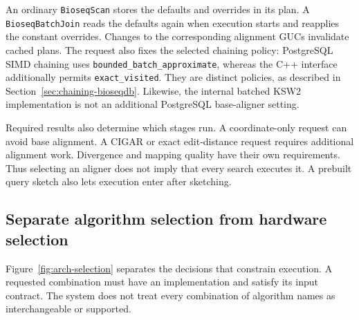 An ordinary \texttt{BioseqScan} stores the defaults and overrides in its
plan. A \texttt{BioseqBatchJoin} reads the defaults again when execution
starts and reapplies the constant overrides. Changes to the corresponding
alignment GUCs invalidate cached plans.
The request also fixes the selected chaining policy:
PostgreSQL SIMD chaining uses \texttt{bounded\_\allowbreak batch\_\allowbreak approximate}, whereas
the C++ interface additionally permits \texttt{exact\_visited}. They are
distinct policies, as described in Section~\ref{sec:chaining-bioseqdb}.
Likewise, the internal batched KSW2 implementation is not an additional
PostgreSQL base-aligner setting.

Required results also determine which stages run. A coordinate-only request
can avoid base alignment. A CIGAR or exact edit-distance request requires
additional alignment work. Divergence and mapping quality have their own
requirements. Thus selecting an aligner does not imply that every search
executes it. A prebuilt query sketch also lets execution enter after
sketching.

\subsection{Separate algorithm selection from hardware selection}
\label{sec:arch-hardware-selection}

Figure~\ref{fig:arch-selection} separates the decisions that constrain
execution. A requested combination must have an implementation and satisfy
its input contract. The system does not treat every combination of algorithm
names as interchangeable or supported.

